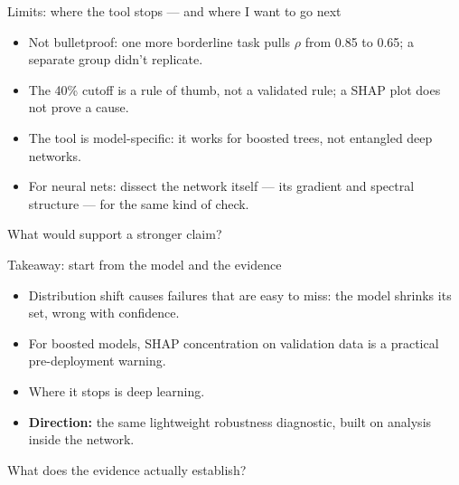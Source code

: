 \documentclass[aspectratio=43,11pt]{beamer}
\begin{document}
\begin{frame}{Limits: where the tool stops --- and where I want to go next}
\begin{itemize}
  \item Not bulletproof: one more borderline task pulls $\rho$ from 0.85 to 0.65; a separate group didn't replicate.
  \item The 40\% cutoff is a rule of thumb, not a validated rule; a SHAP plot does not prove a cause.
  \item The tool is model-specific: it works for boosted trees, not entangled deep networks.
  \item For neural nets: dissect the network itself --- its gradient and spectral structure --- for the same kind of check.
\end{itemize}
\vfill
{\color{struct}\small What would support a stronger claim?}
\end{frame}
\begin{frame}{Takeaway: start from the model and the evidence}
\begin{itemize}
  \item Distribution shift causes failures that are easy to miss: the model shrinks its set, wrong with confidence.
  \item For boosted models, SHAP concentration on validation data is a practical pre-deployment warning.
  \item Where it stops is deep learning.
  \item \textbf{Direction:} the same lightweight robustness diagnostic, built on analysis inside the network.
\end{itemize}
\vfill
{\color{struct}\small What does the evidence actually establish?}
\end{frame}
\end{document}
